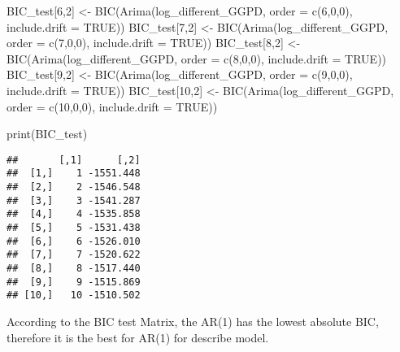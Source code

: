 \documentclass[
]{article}
\newenvironment{Shaded}{\begin{snugshade}}{\end{snugshade}}
\newcommand{\AttributeTok}[1]{\textcolor[rgb]{0.77,0.63,0.00}{#1}}
\newcommand{\ConstantTok}[1]{\textcolor[rgb]{0.00,0.00,0.00}{#1}}
\newcommand{\DecValTok}[1]{\textcolor[rgb]{0.00,0.00,0.81}{#1}}
\newcommand{\FunctionTok}[1]{\textcolor[rgb]{0.00,0.00,0.00}{#1}}
\newcommand{\NormalTok}[1]{#1}
\newcommand{\OtherTok}[1]{\textcolor[rgb]{0.56,0.35,0.01}{#1}}
\begin{document}
\begin{Shaded}
\begin{Highlighting}[]
\NormalTok{BIC\_test[}\DecValTok{6}\NormalTok{,}\DecValTok{2}\NormalTok{] }\OtherTok{\textless{}{-}} \FunctionTok{BIC}\NormalTok{(}\FunctionTok{Arima}\NormalTok{(log\_different\_GGPD, }\AttributeTok{order =} \FunctionTok{c}\NormalTok{(}\DecValTok{6}\NormalTok{,}\DecValTok{0}\NormalTok{,}\DecValTok{0}\NormalTok{), }\AttributeTok{include.drift =} \ConstantTok{TRUE}\NormalTok{))}
\NormalTok{BIC\_test[}\DecValTok{7}\NormalTok{,}\DecValTok{2}\NormalTok{] }\OtherTok{\textless{}{-}} \FunctionTok{BIC}\NormalTok{(}\FunctionTok{Arima}\NormalTok{(log\_different\_GGPD, }\AttributeTok{order =} \FunctionTok{c}\NormalTok{(}\DecValTok{7}\NormalTok{,}\DecValTok{0}\NormalTok{,}\DecValTok{0}\NormalTok{), }\AttributeTok{include.drift =} \ConstantTok{TRUE}\NormalTok{))}
\NormalTok{BIC\_test[}\DecValTok{8}\NormalTok{,}\DecValTok{2}\NormalTok{] }\OtherTok{\textless{}{-}} \FunctionTok{BIC}\NormalTok{(}\FunctionTok{Arima}\NormalTok{(log\_different\_GGPD, }\AttributeTok{order =} \FunctionTok{c}\NormalTok{(}\DecValTok{8}\NormalTok{,}\DecValTok{0}\NormalTok{,}\DecValTok{0}\NormalTok{), }\AttributeTok{include.drift =} \ConstantTok{TRUE}\NormalTok{))}
\NormalTok{BIC\_test[}\DecValTok{9}\NormalTok{,}\DecValTok{2}\NormalTok{] }\OtherTok{\textless{}{-}} \FunctionTok{BIC}\NormalTok{(}\FunctionTok{Arima}\NormalTok{(log\_different\_GGPD, }\AttributeTok{order =} \FunctionTok{c}\NormalTok{(}\DecValTok{9}\NormalTok{,}\DecValTok{0}\NormalTok{,}\DecValTok{0}\NormalTok{), }\AttributeTok{include.drift =} \ConstantTok{TRUE}\NormalTok{))}
\NormalTok{BIC\_test[}\DecValTok{10}\NormalTok{,}\DecValTok{2}\NormalTok{] }\OtherTok{\textless{}{-}} \FunctionTok{BIC}\NormalTok{(}\FunctionTok{Arima}\NormalTok{(log\_different\_GGPD, }\AttributeTok{order =} \FunctionTok{c}\NormalTok{(}\DecValTok{10}\NormalTok{,}\DecValTok{0}\NormalTok{,}\DecValTok{0}\NormalTok{), }\AttributeTok{include.drift =} \ConstantTok{TRUE}\NormalTok{))}


\FunctionTok{print}\NormalTok{(BIC\_test)}
\end{Highlighting}
\end{Shaded}

\begin{verbatim}
##       [,1]      [,2]
##  [1,]    1 -1551.448
##  [2,]    2 -1546.548
##  [3,]    3 -1541.287
##  [4,]    4 -1535.858
##  [5,]    5 -1531.438
##  [6,]    6 -1526.010
##  [7,]    7 -1520.622
##  [8,]    8 -1517.440
##  [9,]    9 -1515.869
## [10,]   10 -1510.502
\end{verbatim}

According to the BIC test Matrix, the AR(1) has the lowest absolute BIC,
therefore it is the best for AR(1) for describe model.
\end{document}

